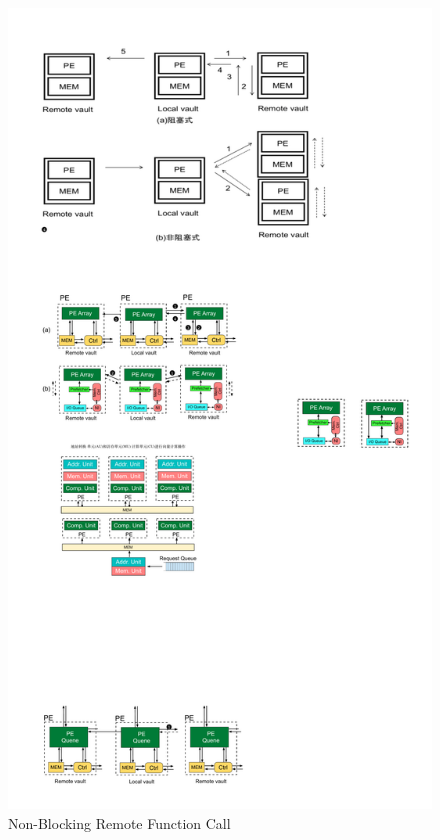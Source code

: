 \documentclass[9pt,conference]{IEEEtran}
\begin{document}
\begin{figure}[htbp]
    \centering
    \includegraphics[scale=0.3]{fig/message.pdf}
    \caption{Non-Blocking Remote Function Call}
    \label{fig:non-block}
\end{figure}
\end{document}
